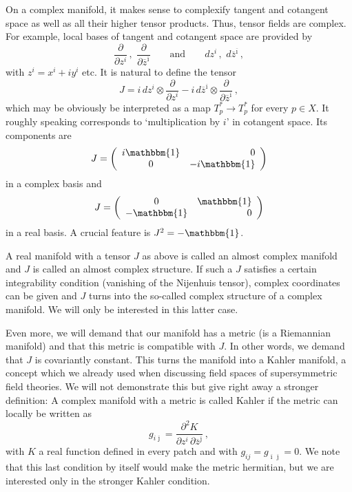 \documentclass[12pt]{article}
\newcommand{\be}{\begin{equation}}
\newcommand{\ee}{\end{equation}}
\newcommand{\ol}{\overline}
\numberwithin{equation}{section}
\begin{document}
On a complex manifold, it makes sense to complexify tangent and cotangent space as well as all their higher tensor products. Thus, tensor fields are complex. For example, local bases of tangent and cotangent space are provided by
\be
\frac{\partial}{\partial z^i}\,,\,\,\frac{\partial}{\partial \ol{z}^{\ol{\imath}}}\qquad\mbox{and}\qquad dz^i\,,\,\,d\ol{z}^{\ol{\imath}}\,,
\ee
with $z^i=x^i+iy^i$ etc. It is natural to define the tensor
\be
J=i\,dz^i\otimes\frac{\partial}{\partial z^i}-i\,d\ol{z}^{\ol{\imath}}\otimes
\frac{\partial}{\partial \ol{z}^{\ol{\imath}}}\,,
\ee
which may be obviously be interpreted as a map $T_p^*\to T_p^*$ for every $p\in X$. It roughly speaking corresponds to `multiplication by $i$' in cotangent space. Its components are
\be
J=\left(\begin{array}{cr}i\mathbbm{1} & 0 \\ 0 & -i\mathbbm{1} \end{array}\right)
\ee
in a complex basis and
\be
J=\left(\begin{array}{cr} 0& \mathbbm{1} \\ -\mathbbm{1} & 0 \end{array}\right)
\ee
in a real basis. A crucial feature is $J^2=-\mathbbm{1}$. 

A real manifold with a tensor $J$ as above is called an almost complex manifold and $J$ is called an almost complex structure. If such a $J$ satisfies a certain integrability condition (vanishing of the Nijenhuis tensor), complex coordinates can be given and $J$ turns into the so-called complex structure of a complex manifold. We will only be interested in this latter case. 

Even more, we will demand that our manifold has a metric (is a Riemannian manifold) and that this metric is compatible with $J$. In other words, we demand that $J$ is covariantly constant. This turns the manifold into a Kahler manifold, a concept which we already used when discussing field spaces of supersymmetric field theories. We will not demonstrate this but give right away a stronger definition: A complex manifold with a metric is called Kahler if the metric can locally be written as
\be
g_{i\ol{\jmath}}=\frac{\partial^2 K}{\partial z^i\,\partial\ol{z}^{\ol{\jmath}}}
\,,
\ee
with $K$ a real function defined in every patch and with $g_{ij}=g_{\ol{\imath}\ol{\jmath}}=0$. We note that this last condition by itself would make the metric hermitian, but we are interested only in the stronger Kahler condition. 
\end{document}
